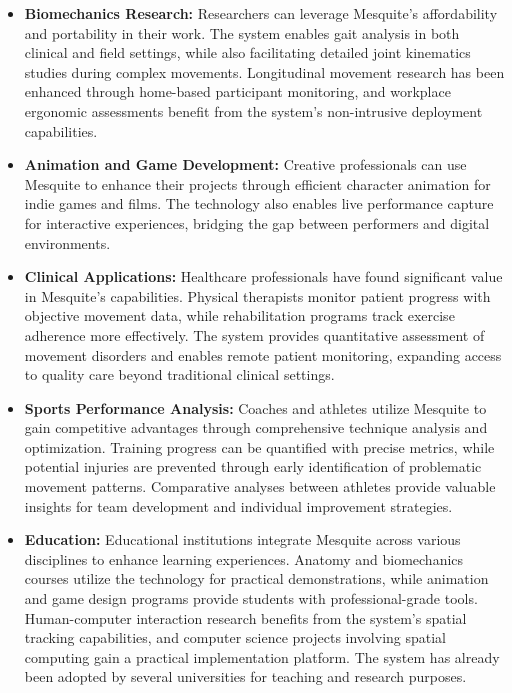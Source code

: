 \documentclass[lettersize,journal]{IEEEtran}
\begin{document}
\begin{itemize}
  \item \textbf{Biomechanics Research:} Researchers can leverage Mesquite's affordability and portability in their work. The system enables gait analysis in both clinical and field settings, while also facilitating detailed joint kinematics studies during complex movements. Longitudinal movement research has been enhanced through home-based participant monitoring, and workplace ergonomic assessments benefit from the system's non-intrusive deployment capabilities.
  \item \textbf{Animation and Game Development:} Creative professionals can use Mesquite to enhance their projects through efficient character animation for indie games and films. The technology also enables live performance capture for interactive experiences, bridging the gap between performers and digital environments.
  \item \textbf{Clinical Applications:} Healthcare professionals have found significant value in Mesquite's capabilities. Physical therapists monitor patient progress with objective movement data, while rehabilitation programs track exercise adherence more effectively. The system provides quantitative assessment of movement disorders and enables remote patient monitoring, expanding access to quality care beyond traditional clinical settings.
  \item \textbf{Sports Performance Analysis:} Coaches and athletes utilize Mesquite to gain competitive advantages through comprehensive technique analysis and optimization. Training progress can be quantified with precise metrics, while potential injuries are prevented through early identification of problematic movement patterns. Comparative analyses between athletes provide valuable insights for team development and individual improvement strategies.
  \item \textbf{Education:} Educational institutions integrate Mesquite across various disciplines to enhance learning experiences. Anatomy and biomechanics courses utilize the technology for practical demonstrations, while animation and game design programs provide students with professional-grade tools. Human-computer interaction research benefits from the system's spatial tracking capabilities, and computer science projects involving spatial computing gain a practical implementation platform. The system has already been adopted by several universities for teaching and research purposes.
\end{itemize}
\end{document}
